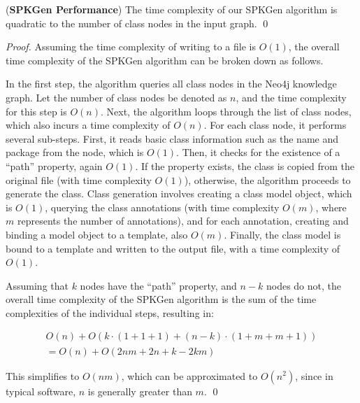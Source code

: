 \documentclass[runningheads]{llncs}
\begin{document}
\begin{theorem}(\textbf{SPKGen Performance})
The time complexity of our SPKGen algorithm is quadratic to the number of class nodes in the input graph.
\qed
\end{theorem}


\begin{proof}

Assuming the time complexity of writing to a file is $O(1)$, the overall time complexity of the SPKGen algorithm can be broken down as follows.

In the first step, the algorithm queries all class nodes in the Neo4j knowledge graph. Let the number of class nodes be denoted as $n$, and the time complexity for this step is $O(n)$. Next, the algorithm loops through the list of class nodes, which also incurs a time complexity of $O(n)$. For each class node, it performs several sub-steps. First, it reads basic class information such as the name and package from the node, which is $O(1)$. Then, it checks for the existence of a “path” property, again $O(1)$. If the property exists, the class is copied from the original file (with time complexity $O(1)$), otherwise, the algorithm proceeds to generate the class. Class generation involves creating a class model object, which is $O(1)$, querying the class annotations (with time complexity $O(m)$, where $m$ represents the number of annotations), and for each annotation, creating and binding a model object to a template, also $O(m)$. Finally, the class model is bound to a template and written to the output file, with a time complexity of $O(1)$.

Assuming that $k$ nodes have the “path” property, and $n - k$ nodes do not, the overall time complexity of the SPKGen algorithm is the sum of the time complexities of the individual steps, resulting in:

\vspace{-0.5cm}
\begin{equation}
\begin{split}
O(n) + O \left( k \cdot (1 + 1 + 1) + (n - k) \cdot (1 + m + m + 1) \right) \\
= O(n) + O(2nm + 2n + k - 2km) \nonumber
\end{split}
\end{equation}

\vspace{-0.2cm}
This simplifies to $O(nm)$, which can be approximated to $O(n^2)$, since in typical software, $n$ is generally greater than $m$. 
\qed
\end{proof}
\end{document}
